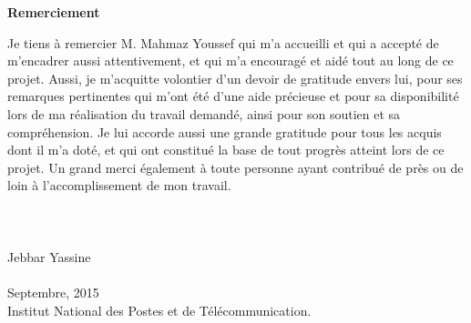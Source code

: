 \newenvironment{acknowledgements}%
    {\cleardoublepage\thispagestyle{plain}\null\vfill\begin{center}%
    \bfseries Remerciement\end{center}}%
    {\vfill\null}
\cleardoublepage
\setcounter{page}{2}
\begin{acknowledgements}
        
Je tiens à remercier M. Mahmaz Youssef qui m'a accueilli et qui a accepté de m'encadrer aussi attentivement, et qui  m'a encouragé et aidé tout au long de ce projet.
Aussi, je m'acquitte volontier d'un devoir de gratitude envers lui, pour ses remarques pertinentes qui m'ont été d'une aide précieuse et pour sa disponibilité lors de ma réalisation du travail demandé, ainsi pour son soutien et sa compréhension.
Je lui accorde aussi une grande gratitude pour tous les acquis dont il m'a doté, et qui ont constitué la base de tout progrès atteint lors de ce projet.
Un grand merci également à toute personne ayant contribué de près ou de loin à l'accomplissement de mon travail.
\\
\\
\\ 
\\
Jebbar Yassine \\ 
\\
Septembre, 2015\\
{Institut National des Postes et de T\'el\'ecommunication. }\\
 \end{acknowledgements}
\newpage
